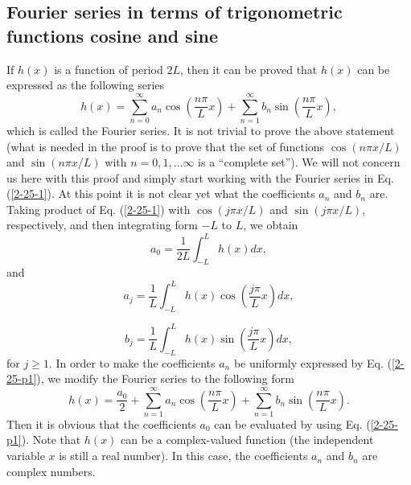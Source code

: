 \documentclass{article}
\begin{document}
\subsection{Fourier series in terms of trigonometric functions cosine and
sine}

If $h (x)$ is a function of period $2 L$, then it can be proved that $h (x)$
can be expressed as the following series
\begin{equation}
  \label{2-25-1} h (x) = \sum_{n = 0}^{\infty} a_n \cos \left( \frac{n \pi}{L}
  x \right) + \sum_{n = 1}^{\infty} b_n \sin \left( \frac{n \pi}{L} x \right),
\end{equation}
which is called the Fourier series. It is not trivial to prove the above
statement (what is needed in the proof is to prove that the set of functions
$\cos (n \pi x / L)$ and $\sin (n \pi x / L)$ with $n = 0, 1, \ldots \infty$
is a ``complete set''). We will not concern us here with this proof and simply
start working with the Fourier series in Eq. (\ref{2-25-1}). At this point it
is not clear yet what the coefficients $a_n$ and $b_n$ are. Taking product of
Eq. (\ref{2-25-1}) with $\cos (j \pi x / L)$ and $\sin (j \pi x / L)$,
respectively, and then integrating form $- L$ to $L$, we obtain
\begin{equation}
  a_0 = \frac{1}{2 L} \int_{- L}^L h (x) d x,
\end{equation}
and
\begin{equation}
  \label{2-25-p1} a_j = \frac{1}{L} \int_{- L}^L h (x) \cos \left( \frac{j
  \pi}{L} x \right) d x,
\end{equation}

\begin{equation}
  b_j = \frac{1}{L} \int_{- L}^L h (x) \sin \left( \frac{j \pi}{L} x \right) d
  x,
\end{equation}
for $j \geqslant 1$. In order to make the coefficients $a_n$ be uniformly
expressed by Eq. (\ref{2-25-p1}), we modify the Fourier series to the
following form
\begin{equation}
  \label{2-25-p3} h (x) = \frac{a_0}{2} + \sum_{n = 1}^{\infty} a_n \cos
  \left( \frac{n \pi}{L} x \right) + \sum_{n = 1}^{\infty} b_n \sin \left(
  \frac{n \pi}{L} x \right) .
\end{equation}
Then it is obvious that the coefficients $a_0$ can be evaluated by using Eq.
(\ref{2-25-p1}). Note that $h (x)$ can be a complex-valued function (the
independent variable $x$ is still a real number). In this case, the
coefficients $a_n$ and $b_n$ are complex numbers.
\end{document}

